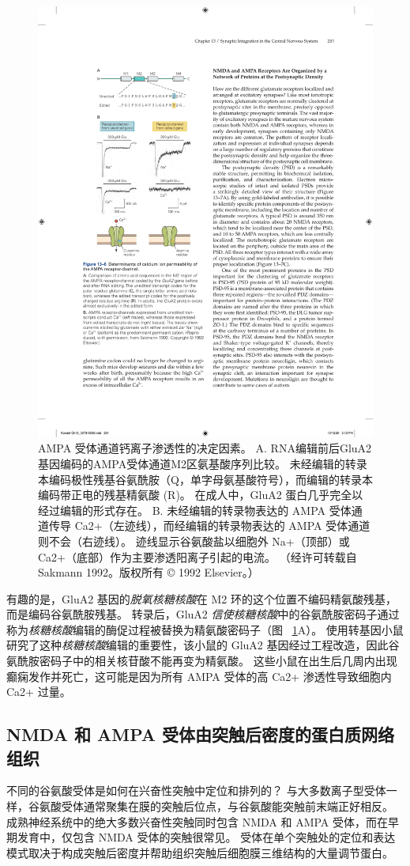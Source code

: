 \begin{figure}[htbp]
	\centering
	\includegraphics[width=0.45\linewidth]{chap13/fig_13_6}
	\caption{AMPA 受体通道钙离子渗透性的决定因素。 A. RNA编辑前后GluA2基因编码的AMPA受体通道M2区氨基酸序列比较。 未经编辑的转录本编码极性残基谷氨酰胺（Q，单字母氨基酸符号），而编辑的转录本编码带正电的残基精氨酸 (R)。 在成人中，GluA2 蛋白几乎完全以经过编辑的形式存在。 B. 未经编辑的转录物表达的 AMPA 受体通道传导 Ca2+（左迹线），而经编辑的转录物表达的 AMPA 受体通道则不会（右迹线）。 迹线显示谷氨酸盐以细胞外 Na+（顶部）或 Ca2+（底部）作为主要渗透阳离子引起的电流。 （经许可转载自 Sakmann 1992。版权所有 © 1992 Elsevier。）}
	\label{fig:13_6}
\end{figure}


有趣的是，GluA2 基因的\textit{脱氧核糖核酸}在 M2 环的这个位置不编码精氨酸残基，而是编码谷氨酰胺残基。
转录后，GluA2 \textit{信使核糖核酸}中的谷氨酰胺密码子通过称为\textit{核糖核酸}编辑的酶促过程被替换为精氨酸密码子（图 ~\ref{fig:13_6}A）。
使用转基因小鼠研究了这种\textit{核糖核酸}编辑的重要性，该小鼠的 GluA2 基因经过工程改造，因此谷氨酰胺密码子中的相关核苷酸不能再变为精氨酸。
这些小鼠在出生后几周内出现癫痫发作并死亡，这可能是因为所有 AMPA 受体的高 Ca2+ 渗透性导致细胞内 Ca2+ 过量。



\subsection{NMDA 和 AMPA 受体由突触后密度的蛋白质网络组织}

不同的谷氨酸受体是如何在兴奋性突触中定位和排列的？ 
与大多数离子型受体一样，谷氨酸受体通常聚集在膜的突触后位点，与谷氨酸能突触前末端正好相反。
成熟神经系统中的绝大多数兴奋性突触同时包含 NMDA 和 AMPA 受体，而在早期发育中，仅包含 NMDA 受体的突触很常见。
受体在单个突触处的定位和表达模式取决于构成突触后密度并帮助组织突触后细胞膜三维结构的大量调节蛋白。


